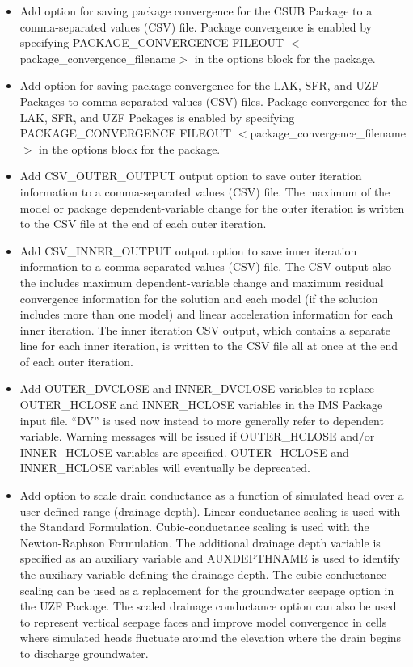 \documentclass[11pt,twoside,twocolumn]{usgsreport}
\begin{document}
\begin{itemize}
\begin{itemize}
		\item Add option for saving package convergence for the CSUB Package to a comma-separated values (CSV) file. Package convergence is enabled by specifying PACKAGE\_CONVERGENCE FILEOUT $<$package\_convergence\_filename$>$ in the options block for the package.
		\item Add option for saving package convergence for the LAK, SFR, and UZF Packages to comma-separated values (CSV) files. Package convergence for the LAK, SFR, and UZF Packages is enabled by specifying PACKAGE\_CONVERGENCE FILEOUT $<$package\_convergence\_filename$>$ in the options block for the package.
		\item Add CSV\_OUTER\_OUTPUT output option to save outer iteration information to a comma-separated values (CSV) file. The maximum of the model or package dependent-variable change for the outer iteration is written to the CSV file at the end of each outer iteration. 
		\item Add CSV\_INNER\_OUTPUT output option to save inner iteration information to a comma-separated values (CSV) file. The CSV output also the includes maximum dependent-variable change and maximum residual convergence information for the solution and each model (if the solution includes more than one model) and linear acceleration information for each inner iteration. The inner iteration CSV output, which contains a separate line for each inner iteration, is written to the CSV file all at once at the end of each outer iteration.
		\item Add OUTER\_DVCLOSE and INNER\_DVCLOSE variables to replace OUTER\_HCLOSE and INNER\_HCLOSE variables in the IMS Package input file. ``DV'' is used now instead to more generally refer to dependent variable.  Warning messages will be issued if OUTER\_HCLOSE and/or INNER\_HCLOSE variables are specified. OUTER\_HCLOSE and INNER\_HCLOSE variables will eventually be deprecated. 
		\item Add option to scale drain conductance as a function of simulated head over a user-defined range (drainage depth). Linear-conductance scaling is used with the Standard Formulation. Cubic-conductance scaling is used with the Newton-Raphson Formulation. The additional drainage depth variable is specified as an auxiliary variable and AUXDEPTHNAME is used to identify the auxiliary variable defining the drainage depth. The cubic-conductance scaling can be used as a replacement for the groundwater seepage option in the UZF Package. The scaled drainage conductance option can also be used to represent vertical seepage faces and improve model convergence in cells where simulated heads fluctuate around the elevation where the drain begins to discharge groundwater.

\end{itemize}
\end{itemize}
\end{document}
